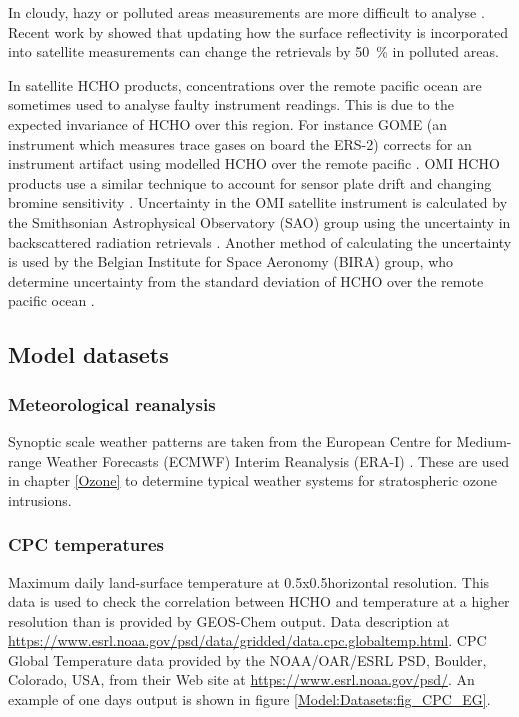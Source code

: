       In cloudy, hazy or polluted areas measurements are more difficult to analyse \parencite[e.g.][]{Palmer2003,Marais2014}.
      Recent work by \textcite{Vasilkov2017} showed that updating how the surface reflectivity is incorporated into satellite measurements can change the retrievals by 50~\% in polluted areas.
      
      In satellite HCHO products, concentrations over the remote pacific ocean are sometimes used to analyse faulty instrument readings.
      This is due to the expected invariance of HCHO over this region.
      For instance GOME (an instrument which measures trace gases on board the ERS-2) corrects for an instrument artifact using modelled HCHO over the remote pacific \parencite{Shim2005}.
      OMI HCHO products use a similar technique to account for sensor plate drift and changing bromine sensitivity \parencite{Abad2015}.
      Uncertainty in the OMI satellite instrument is calculated by the Smithsonian Astrophysical Observatory (SAO) group using the uncertainty in backscattered radiation retrievals \parencite{Abad2015, Abad2016}.
      Another method of calculating the uncertainty is used by the Belgian Institute for Space Aeronomy (BIRA) group, who determine uncertainty from the standard deviation of HCHO over the remote pacific ocean \parencite{DeSmedt2012, DeSmedt2015}.
      
      
    
  \subsection{Model datasets}
  \subsubsection{Meteorological reanalysis}
  \label{Model:Datasets:ERAI}
  
  Synoptic scale weather patterns are taken from the European Centre for Medium-range Weather Forecasts (ECMWF) Interim Reanalysis (ERA-I) \parencite{Dee2011}.
  These are used in chapter \ref{Ozone} to determine typical weather systems for stratospheric ozone intrusions.
  
  \subsubsection{CPC temperatures}
  Maximum daily land-surface temperature at 0.5x0.5\degr horizontal resolution. 
  This data is used to check the correlation between HCHO and temperature at a higher resolution than is provided by GEOS-Chem output.
  Data description at \url{https://www.esrl.noaa.gov/psd/data/gridded/data.cpc.globaltemp.html}.
  CPC Global Temperature data provided by the NOAA/OAR/ESRL PSD, Boulder, Colorado, USA, from their Web site at \url{https://www.esrl.noaa.gov/psd/}.
  An example of one days output is shown in figure \ref{Model:Datasets:fig_CPC_EG}.
  
